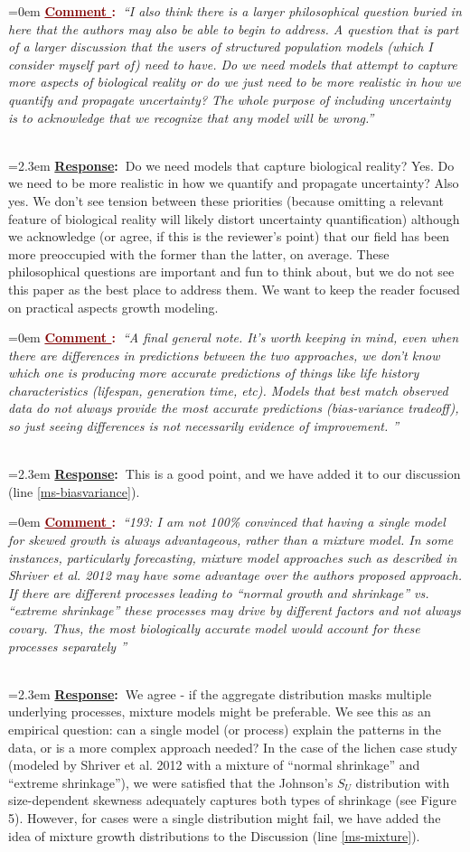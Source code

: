\documentclass[12pt]{article}
\newcounter{cN}
\newcommand{\comment}[1]{
	\vspace{2em}
	\refstepcounter{cN} %
	\noindent \hangindent=0em \textbf{\textcolor{Maroon}{\uline{Comment \thecN}:~}}\emph{``#1''}
	}
\newcommand{\response}[1]{
	\\[0.25em]
	\hangindent=2.3em \textbf{\textcolor{NavyBlue}{\uline{Response}:~}}#1
	}
\begin{document}
\comment{I also think there is a larger philosophical question buried in here that the authors may also be able to begin to address. A question that is part of a larger discussion that the users of structured population models (which I consider myself part of) need to have.  Do we need models that attempt to capture more aspects of biological reality or do we just need to be more realistic in how we quantify and propagate uncertainty? The whole purpose of including uncertainty is to acknowledge that we recognize that any model will be wrong.}
\response{Do we need models that capture biological reality? Yes. Do we need to be more realistic in how we quantify and propagate uncertainty? Also yes. We don't see tension between these priorities (because omitting a relevant feature of biological reality will likely distort uncertainty quantification) although we acknowledge (or agree, if this is the reviewer's point) that our field has been more preoccupied with the former than the latter, on average. These philosophical questions are important and fun to think about, but we do not see this paper as the best place to address them. We want to keep the reader focused on practical aspects growth modeling.}

\comment{A final general note.  It’s worth keeping in mind, even when there are differences in predictions between the two approaches, we don’t know which one is producing more accurate predictions of things like life history characteristics (lifespan, generation time, etc). Models that best match observed data do not always provide the most accurate predictions (bias-variance tradeoff), so just seeing differences is not necessarily evidence of improvement.  }
\response{This is a good point, and we have added it to our discussion (line \ref{ms-biasvariance}). }

\comment{193: I am not 100\% convinced that having a single model for skewed growth is always advantageous, rather than a mixture model. In some instances, particularly forecasting, mixture model approaches such as described in Shriver et al. 2012 may have some advantage over the authors proposed approach. If there are different processes leading to “normal growth and shrinkage” vs. “extreme shrinkage” these processes may drive by different factors and not always covary. Thus, the most biologically accurate model would account for these processes separately }
\response{We agree - if the aggregate distribution masks multiple underlying processes, mixture models might be preferable. We see this as an empirical question: can a single model (or process) explain the patterns in the data, or is a more complex approach needed? In the case of the lichen case study (modeled by Shriver et al. 2012 with a mixture of ``normal shrinkage'' and ``extreme shrinkage''), we were satisfied that the Johnson's $S_{U}$ distribution with size-dependent skewness adequately captures both types of shrinkage (see Figure 5). However, for cases were a single distribution might fail, we have added the idea of mixture growth distributions to the Discussion (line \ref{ms-mixture}).}
\end{document}
